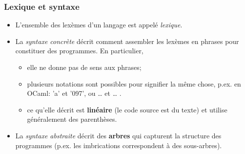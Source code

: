 %
\begin{frame}
\frametitle{Lexique et syntaxe}

\begin{itemize}

  \item L'ensemble des lexèmes d'un langage est appelé
  \emph{lexique}.

  \item La \emph{syntaxe concrète} décrit comment assembler les
  lexèmes en phrases pour constituer des programmes. En particulier,

    \begin{itemize}

      \item elle ne donne pas de sens aux phrases;

      \item plusieurs notations sont possibles pour signifier la même
      chose, p.ex. en OCaml: \mbox{\small \textsf{'a'}} et
      \mbox{\small \textsf{'097'}}, ou {\small
      \lpar{} \ldots \rpar} et {\small \Xbegin \ldots{} \Xend}.

      \item ce qu'elle décrit est \textbf{linéaire} (le code source est du
      texte) et utilise généralement des parenthèses.

    \end{itemize}

  \item La \emph{syntaxe abstraite} décrit des \textbf{arbres} qui
  capturent la structure des programmes (p.ex. les imbrications
  correspondent à des sous-arbres).

\end{itemize}

\end{frame}

